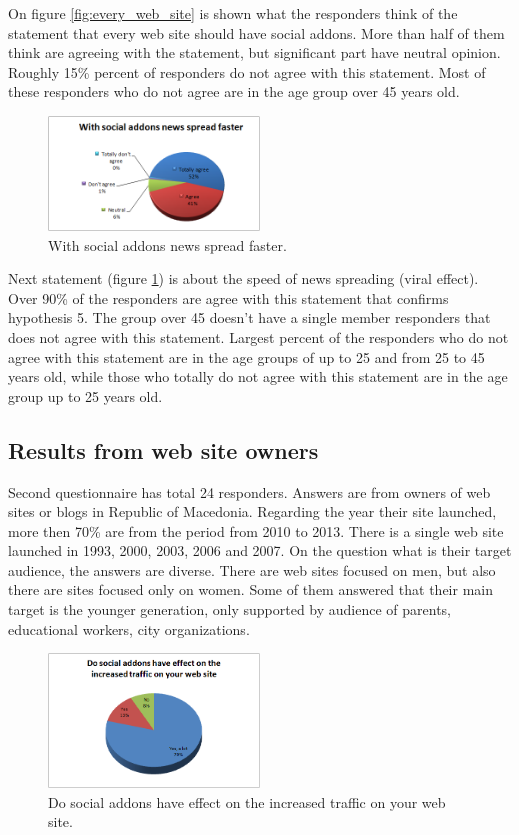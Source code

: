 \documentclass[conference]{IEEEtran}
\begin{document}
On figure \ref{fig:every_web_site} is shown what the responders think of the
statement that every web site should have social addons. More than half of them
think are agreeing with the statement, but significant part have neutral
opinion. Roughly 15\% percent of responders do not agree with this statement.
Most of these responders who do not agree are in the age group over 45 years
old.

\begin{figure}[htb]
\centering
\includegraphics[width=0.5\textwidth]{viral-images/news_spread_faster}
\caption{With social addons news spread faster.}
\label{fig:news_spread_faster}
\end{figure}

Next statement (figure \ref{fig:news_spread_faster}) is about the speed of news
spreading (viral effect). Over 90\% of the responders are agree with this
statement that confirms hypothesis 5. The group over 45 doesn't have a single
member responders that does not agree with this statement. Largest percent of the
responders who do not agree with this statement are in the age groups of up to
25 and from 25 to 45 years old, while those who totally do not agree with this
statement are in the age group up to 25 years old.

\subsection{Results from web site owners}

Second questionnaire has total 24 responders. Answers are from owners of web
sites or blogs in Republic of Macedonia. Regarding the year their site launched,
more then 70\% are from the period from 2010 to 2013. There is a single web site
launched in 1993, 2000, 2003, 2006 and 2007. On the question what is their
target audience, the answers are diverse. There are web sites focused on men,
but also there are sites focused only on women. Some of them answered that their
main target is the younger generation, only supported by audience of parents,
educational workers, city organizations.

\begin{figure}[htb]
\centering
\includegraphics[width=0.5\textwidth]{viral-images/effect}
\caption{Do social addons have effect on the increased traffic on your web
site.}
\label{fig:effect}
\end{figure}
\end{document}
